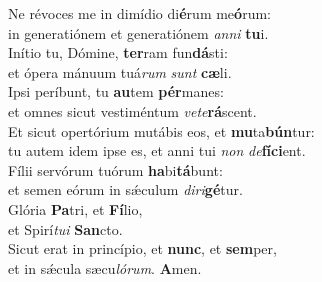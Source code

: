 \oddverse Ne révoces me in dimídio di\textbf{é}rum me\textbf{ó}rum:~\*\\
\oddverse in generatiónem et generatiónem \textit{an}\textit{ni} \textbf{tu}i.\\
\evenverse Inítio tu, Dómine, \textbf{ter}ram fun\textbf{dá}sti:~\*\\
\evenverse et ópera mánuum tuá\textit{rum} \textit{sunt} \textbf{cæ}li.\\
\oddverse Ipsi períbunt, tu \textbf{au}tem \textbf{pér}manes:~\*\\
\oddverse et omnes sicut vestiméntum \textit{ve}\textit{te}\textbf{rá}scent.\\
\evenverse Et sicut opertórium mutábis eos, et \textbf{mu}ta\textbf{bún}tur:~\*\\
\evenverse tu autem idem ipse es, et anni tui \textit{non} \textit{de}\textbf{fí}\textbf{ci}ent.\\
\oddverse Fílii servórum tuórum \textbf{ha}bi\textbf{tá}bunt:~\*\\
\oddverse et semen eórum in sǽculum \textit{di}\textit{ri}\textbf{gé}tur.\\
\evenverse Glória \textbf{Pa}tri, et \textbf{Fí}lio,~\*\\
\evenverse et Spirí\textit{tu}\textit{i} \textbf{San}cto.\\
\oddverse Sicut erat in princípio, et \textbf{nunc}, et \textbf{sem}per,~\*\\
\oddverse et in sǽcula sæcu\textit{ló}\textit{rum}. \textbf{A}men.\\
